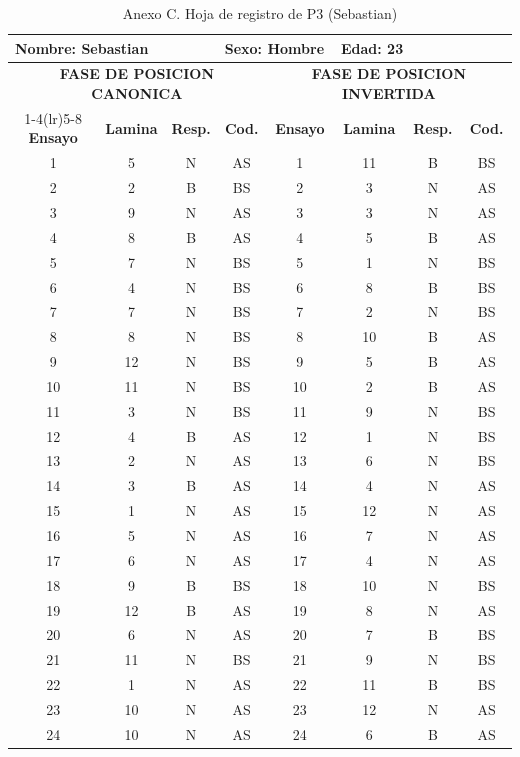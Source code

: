 \documentclass[stu, 12pt, letterpaper, donotrepeattitle, floatsintext, natbib]{apa7}
\begin{document}
\begin{table}[p]
\centering
\scriptsize
\caption{Anexo C. Hoja de registro de P3 (Sebastian)}
\label{anexo:p3}
\begin{tabular}{cccccccc}
\toprule
\multicolumn{3}{l}{\textbf{Nombre:} Sebastian} & \multicolumn{2}{l}{\textbf{Sexo:} Hombre} & \multicolumn{3}{l}{\textbf{Edad:} 23} \\
\midrule
\multicolumn{4}{c}{\textbf{FASE DE POSICION CANONICA}} & \multicolumn{4}{c}{\textbf{FASE DE POSICION INVERTIDA}} \\
\cmidrule(lr){1-4}\cmidrule(lr){5-8}
\textbf{Ensayo} & \textbf{Lamina} & \textbf{Resp.} & \textbf{Cod.} & \textbf{Ensayo} & \textbf{Lamina} & \textbf{Resp.} & \textbf{Cod.} \\
\midrule
1 & 5 & N & AS & 1 & 11 & B & BS \\
2 & 2 & B & BS & 2 & 3 & N & AS \\
3 & 9 & N & AS & 3 & 3 & N & AS \\
4 & 8 & B & AS & 4 & 5 & B & AS \\
5 & 7 & N & BS & 5 & 1 & N & BS \\
6 & 4 & N & BS & 6 & 8 & B & BS \\
7 & 7 & N & BS & 7 & 2 & N & BS \\
8 & 8 & N & BS & 8 & 10 & B & AS \\
9 & 12 & N & BS & 9 & 5 & B & AS \\
10 & 11 & N & BS & 10 & 2 & B & AS \\
11 & 3 & N & BS & 11 & 9 & N & BS \\
12 & 4 & B & AS & 12 & 1 & N & BS \\
13 & 2 & N & AS & 13 & 6 & N & BS \\
14 & 3 & B & AS & 14 & 4 & N & AS \\
15 & 1 & N & AS & 15 & 12 & N & AS \\
16 & 5 & N & AS & 16 & 7 & N & AS \\
17 & 6 & N & AS & 17 & 4 & N & AS \\
18 & 9 & B & BS & 18 & 10 & N & BS \\
19 & 12 & B & AS & 19 & 8 & N & AS \\
20 & 6 & N & AS & 20 & 7 & B & BS \\
21 & 11 & N & BS & 21 & 9 & N & BS \\
22 & 1 & N & AS & 22 & 11 & B & BS \\
23 & 10 & N & AS & 23 & 12 & N & AS \\
24 & 10 & N & AS & 24 & 6 & B & AS \\
\bottomrule
\end{tabular}
\end{table}
\end{document}

